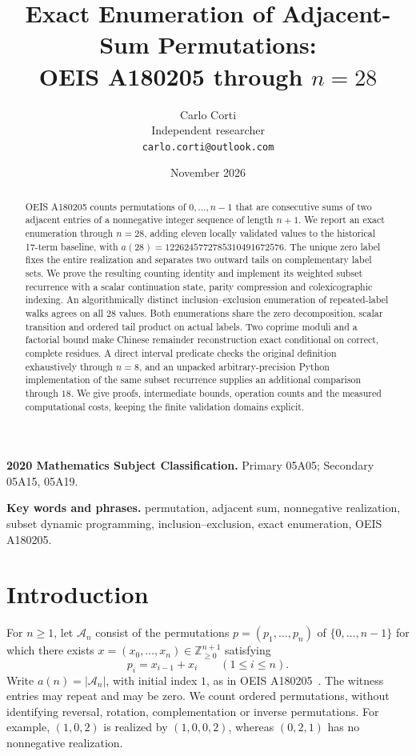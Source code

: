 \documentclass[11pt]{article}
\title{Exact Enumeration of Adjacent-Sum Permutations:\\OEIS A180205 through $n=28$}
\author{Carlo Corti\\Independent researcher\\\texttt{carlo.corti@outlook.com}}
\date{November 2026}
\theoremstyle{definition}
\theoremstyle{remark}
\newcommand{\Znn}{\mathbb Z_{\geq0}}
\newcommand{\An}{\mathcal A_n}
\begin{document}
\maketitle

\begin{abstract}
OEIS A180205 counts permutations of $0,\ldots,n-1$ that are
consecutive sums of two adjacent entries of a nonnegative integer sequence of length
$n+1$. We report an exact enumeration through $n=28$, adding eleven locally
validated values to the historical 17-term baseline, with
$a(28)=1226245772785310491672576$. The unique zero label fixes the entire
realization and separates two outward tails on complementary label sets.
We prove the resulting counting identity and implement its weighted subset
recurrence with a scalar continuation state, parity compression and colexicographic
indexing. An algorithmically distinct inclusion--exclusion enumeration of
repeated-label walks agrees on all 28 values. Both enumerations share the
zero decomposition, scalar transition and ordered tail product on actual
labels. Two coprime moduli and a factorial bound make Chinese remainder
reconstruction exact conditional on correct, complete residues.
A direct interval predicate checks the original definition
exhaustively through $n=8$, and an unpacked arbitrary-precision Python
implementation of the same subset recurrence supplies an additional comparison
through $18$. We give
proofs, intermediate bounds, operation counts and the measured computational
costs, keeping the finite validation domains explicit.
\end{abstract}

\noindent\textbf{2020 Mathematics Subject Classification.}
Primary 05A05; Secondary 05A15, 05A19.

\smallskip
\noindent\textbf{Key words and phrases.}
permutation, adjacent sum, nonnegative realization, subset dynamic programming,
inclusion--exclusion, exact enumeration, OEIS A180205.

\section{Introduction}
\label{sec:intro}

For $n\geq1$, let $\An$ consist of the permutations $p=(p_1,\ldots,p_n)$
of $\{0,\ldots,n-1\}$ for which there exists
$x=(x_0,\ldots,x_n)\in\Znn^{n+1}$ satisfying
\begin{equation}
 p_i=x_{i-1}+x_i\qquad(1\leq i\leq n).
 \label{eq:definition}
\end{equation}
Write $a(n)=|\An|$, with initial index $1$, as in OEIS
A180205~\cite{hardin}. The witness entries may repeat and may be zero.
We count ordered permutations, without identifying reversal, rotation,
complementation or inverse permutations. For example, $(1,0,2)$ is
realized by $(1,0,0,2)$, whereas $(0,2,1)$ has no nonnegative realization.
\end{document}
